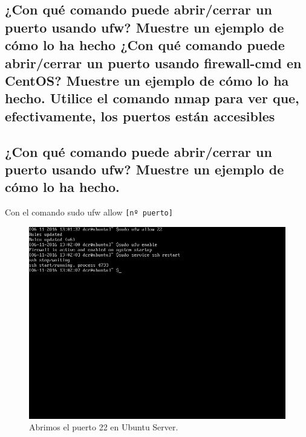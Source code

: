 \begin{flushleft}
\section{¿Con qué comando puede abrir/cerrar un puerto usando ufw? Muestre un ejemplo de cómo lo ha hecho ¿Con qué comando puede abrir/cerrar un puerto usando firewall-cmd en CentOS? Muestre un ejemplo de cómo lo ha hecho. Utilice el comando nmap para ver que, efectivamente, los puertos están accesibles}
	
\subsection{¿Con qué comando puede abrir/cerrar un puerto usando ufw? Muestre un ejemplo de cómo lo ha hecho.}
Con el comando sudo ufw allow \verb|[nº puerto] | \cite{c3a}
\begin{figure}[H]
 	\centering
	\includegraphics[scale=0.4]{ufw_ubu.png}
	\caption{Abrimos el puerto 22 en Ubuntu Server.}
\end{figure}


\end{flushleft}

